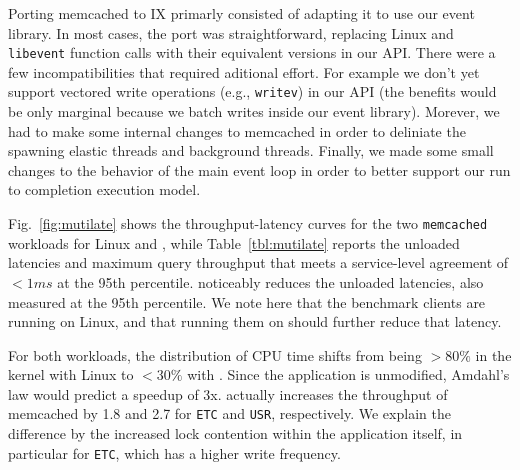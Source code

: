  Porting memcached to IX primarly consisted of adapting it
to use our event library. In most cases, the port was straightforward,
replacing Linux and \texttt{libevent} function calls with their equivalent
versions in our API. There were a few incompatibilities that required
aditional effort. For example we don't yet support vectored write
operations (e.g., \texttt{writev}) in our
API (the benefits would be only marginal because we batch
writes inside our event library). Morever, we had to make some internal changes
to memcached in order to deliniate the spawning elastic threads and background
threads.   Finally, we made some small changes to the behavior of the main
event loop in order to better support our run to completion execution model.



 Fig.~\ref{fig:mutilate} shows the throughput-latency curves for the
two \texttt{memcached} workloads for Linux and \ix, while
Table~\ref{tbl:mutilate} reports the unloaded latencies and maximum query throughput that meets a service-level agreement of $<1ms$ at the 95th percentile.
\ix noticeably reduces the unloaded latencies, also measured
at the 95th percentile.  We note here that the benchmark
clients are running on Linux, and that running them on \ix should
further reduce that latency. 

For both workloads, the distribution of CPU time shifts from being
$>80\%$ in the kernel with Linux to $<30\%$ with \ix.  Since the
application is unmodified, Amdahl's law would predict a speedup of 3x.
\ix actually increases the throughput of memcached by 1.8 and 2.7
for \texttt{ETC} and \texttt{USR}, respectively.  We explain the
difference by the increased lock contention within the application
itself, in particular for \texttt{ETC}, which has a higher write frequency.


%


